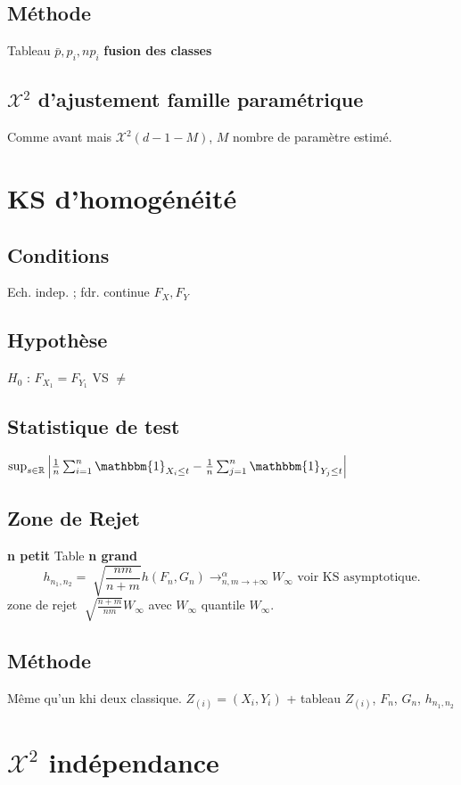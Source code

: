\documentclass[9pt]{article}
\theoremstyle{plain}%
\theoremstyle{definition}
\theoremstyle{remark}
\begin{document}
\begin{multicols}{3}
\subsection*{Méthode}
Tableau $ \bar{p}, p_i, np_i $ \textbf{fusion des classes}

\subsection{$ \mathcal{X}^2 $ d'ajustement famille paramétrique}
Comme avant mais $ \mathcal{X}^2(d-1-M) $, $ M $ nombre de paramètre estimé.

\section{KS d'homogénéité}
\subsection*{Conditions}
Ech. indep. ; fdr. continue $ F_X, F_Y $ 

\subsection*{Hypothèse}
$ H_0 $ : $ F_{X_1} = F_{Y_1} $ VS $ \neq  $ 

\subsection*{Statistique de test}
$\sup _{s \in \mathbb{R}} \left| \frac{1}{n}\sum_{i=1}^{n} \mathbbm{1}_{X_i \leq t} - \frac{1}{n}\sum_{j=1}^{n} \mathbbm{1}_{Y_j \leq t} \right| $

\subsection*{Zone de Rejet}
\textbf{n petit} Table
\textbf{n grand} 
        \[
            h_{n_1, n_2} = \sqrt[]{\frac{nm}{n+m}}h(F_n, G_n) \to ^{\alpha }_{n,m \to +\infty } W_\infty \text{ voir KS asymptotique}
        .\]
        zone de rejet $ \sqrt[]{\frac{n+m}{nm}}W_\infty  $ avec $ W_\infty  $ quantile $ W_\infty  $.

\subsection*{Méthode}
Même qu'un khi deux classique. $ Z_{(i)} = (X_i, Y_i) $ + tableau  $Z_{(i)}$, $F_n$, $G_n$, $h_{n_1, n_2}$ 

\section{$ \mathcal{X}^2 $ indépendance}

\end{multicols}
\end{document}
